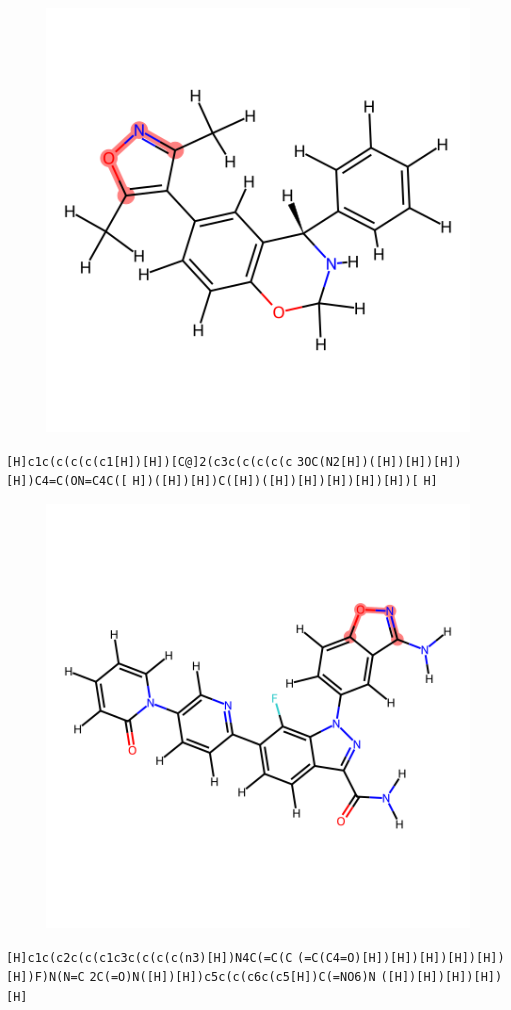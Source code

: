 \documentclass{article}
\begin{document}
\begin{figure}[ht]
\centering
    \includegraphics{mol142.png}
\end{figure}
\verb|[H]c1c(c(c(c(c1[H])[H])[C@]2(c3c(c(c(c(c| \verb|3OC(N2[H])([H])[H])[H])[H])C4=C(ON=C4C([| \verb|H])([H])[H])C([H])([H])[H])[H])[H])[H])[| \verb|H]|

\begin{figure}[ht]
\centering
    \includegraphics{mol143.png}
\end{figure}
\verb|[H]c1c(c2c(c(c1c3c(c(c(c(n3)[H])N4C(=C(C| \verb|(=C(C4=O)[H])[H])[H])[H])[H])[H])F)N(N=C| \verb|2C(=O)N([H])[H])c5c(c(c6c(c5[H])C(=NO6)N| \verb|([H])[H])[H])[H])[H]|
\end{document}
